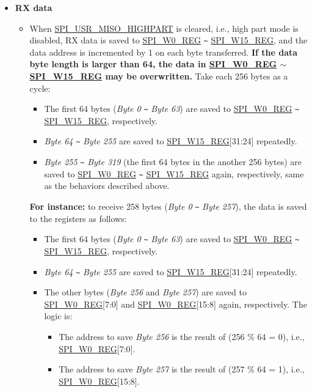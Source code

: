\documentclass[main\_\_EN.tex]{subfiles}
\begin{document}
\begin{itemize}
    \item \textbf{RX data}
    \begin{itemize}
        \item When \hyperref[fielddesc:SPIUSRMISOHIGHPART]{SPI\_USR\_MISO\_HIGHPART} is cleared, i.e., high part mode is disabled, RX data is saved to \hyperref[regdesc:SPIW0REG]{SPI\_W0\_REG} \verb+~+ \hyperref[regdesc:SPIW0REG]{SPI\_W15\_REG}, and the data address is incremented by 1 on each byte transferred. \textbf{If the data byte length is larger than 64, the data in \hyperref[regdesc:SPIW0REG]{SPI\_W0\_REG} $\sim$ \hyperref[regdesc:SPIW0REG]{SPI\_W15\_REG} may be overwritten.} Take each 256 bytes as a cycle:
        \begin{itemize}
            \item The first 64 bytes (\emph{Byte 0} \verb+~+ \emph{Byte 63}) are saved to \hyperref[regdesc:SPIW0REG]{SPI\_W0\_REG} \verb+~+ \hyperref[regdesc:SPIW0REG]{SPI\_W15\_REG}, respectively.
            \item \emph{Byte 64} \verb+~+ \emph{Byte 255} are saved to \hyperref[regdesc:SPIW0REG]{SPI\_W15\_REG}[31:24] repeatedly.
            \item \emph{Byte 255} \verb+~+ \emph{Byte 319} (the first 64 bytes in the another 256 bytes) are saved to \hyperref[regdesc:SPIW0REG]{SPI\_W0\_REG} \verb+~+ \hyperref[regdesc:SPIW0REG]{SPI\_W15\_REG} again, respectively, same as the behaviors described above.
        \end{itemize}

        \textbf{For instance:} to receive 258 bytes (\emph{Byte 0} \verb+~+ \emph{Byte 257}), the data is saved to the registers as follows:
        \begin{itemize}
            \item The first 64 bytes (\emph{Byte 0} \verb+~+ \emph{Byte 63}) are saved to \hyperref[regdesc:SPIW0REG]{SPI\_W0\_REG} \verb+~+ \hyperref[regdesc:SPIW0REG]{SPI\_W15\_REG}, respectively.
            \item \emph{Byte 64} \verb+~+ \emph{Byte 255} are saved to \hyperref[regdesc:SPIW0REG]{SPI\_W15\_REG}[31:24] repeatedly.
            \item The other bytes (\emph{Byte 256} and \emph{Byte 257}) are saved to \hyperref[regdesc:SPIW0REG]{SPI\_W0\_REG}[7:0] and \hyperref[regdesc:SPIW0REG]{SPI\_W0\_REG}[15:8] again, respectively. The logic is:
            \begin{itemize}
                \item The address to save \emph{Byte 256} is the result of (256 \% 64 = 0), i.e., \hyperref[regdesc:SPIW0REG]{SPI\_W0\_REG}[7:0].
                \item The address to save \emph{Byte 257} is the result of (257 \% 64 = 1), i.e., \hyperref[regdesc:SPIW0REG]{SPI\_W0\_REG}[15:8].
            \end{itemize}
        \end{itemize}


\end{itemize}
\end{itemize}
\end{document}
